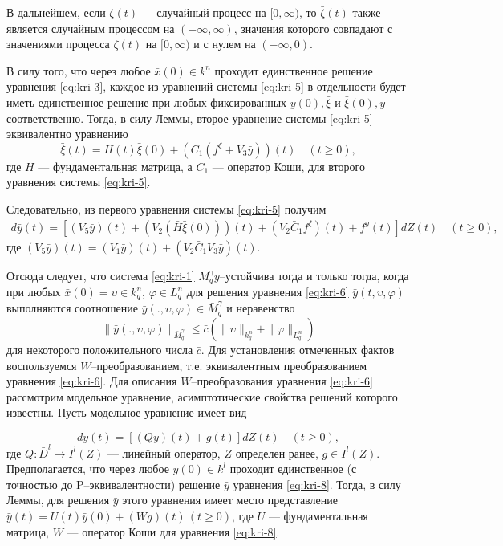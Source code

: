 В дальнейшем, если $\zeta (t)$  --- случайный процесс на
$[0,\infty)$, то $\bar \zeta (t)$ также является  случайным
процессом на  $(- \infty , \infty )$, значения которого  совпадают с
значениями процесса $\zeta (t)$ на $[0,\infty)$ и с нулем на
$(-\infty , 0)$.

В силу того, что через любое $\bar x(0) \in k^n$ проходит
единственное решение уравнения \eqref{eq:kri-3}, каждое из уравнений системы \eqref{eq:kri-5}
в отдельности будет иметь единственное решение при любых
фиксированных $\bar y(0), \bar \xi $ и $\bar \xi(0), \bar y$
соответственно. Тогда, в силу Леммы, второе уравнение системы \eqref{eq:kri-5}
эквивалентно уравнению
$$
\bar \xi(t) = H(t)\bar \xi(0) + (C_1(f^\xi + V_3\bar y))(t) \quad
(t \ge 0),
$$
где $H$ --- фундаментальная матрица, а $C_1$ --- оператор Коши, для
второго уравнения системы \eqref{eq:kri-5}.

Следовательно, из первого уравнения системы \eqref{eq:kri-5} получим
\begin{equation}
    \label{eq:kri-6}
    \begin{array}{crl}
    d\bar y(t) = [(V_5\bar y)(t) + (V_2(\bar H\bar \xi(0)))(t)  +
    (V_2\bar C_1f^\xi)(t) + f^y(t)]dZ(t)\quad (t \ge 0),
    \end{array}
\end{equation}
где $(V_5\bar y)(t) = (V_1\bar y)(t)+ (V_2\bar C_1V_3\bar y)(t)$.


Отсюда следует, что система \eqref{eq:kri-1} $M_q^\gamma y$--устойчива тогда и
только тогда, когда при любых $\bar x(0) = \upsilon \in k^n_q$,
$\varphi \in L^n_q$ для решения уравнения \eqref{eq:kri-6} $\bar y(t, \upsilon,
\varphi)$ выполняются соотношение $\bar y(., \upsilon, \varphi) \in
\bar M_q^\gamma$ и неравенство
\begin{equation}
\label{eq:kri-7}
\|\bar y(., \upsilon, \varphi)\|_{\bar M_q^\gamma} \le \bar c\left(\|\upsilon\|_{k^n_q} +
 \|\varphi \|_{L^n_q}\right)
\end{equation}
для некоторого положительного числа $\bar c$. Для установления
отмеченных фактов воспользуемся $W$--преобразованием, т.е.
эквивалентным преобразованием уравнения \eqref{eq:kri-6}. Для описания
$W$--преобразования уравнения \eqref{eq:kri-6} рассмотрим модельное уравнение,
асимптотические свойства решений которого известны. Пусть модельное
уравнение имеет вид

\begin{equation}
\label{eq:kri-8}
d\bar y(t) = [(Q\bar y)(t) + g(t)]dZ(t) \quad (t \ge 0),
\end{equation}
где $Q:\bar D^l \rightarrow I^l(Z)$ --- линейный оператор, $Z$
определен ранее, $g \in I^l(Z)$. Предполагается, что через любое
$\bar y(0) \in k^l$ проходит единственное (с точностью до
P--эквивалентности) решение $\bar y$ уравнения \eqref{eq:kri-8}. Тогда, в силу
Леммы, для решения $\bar y$ этого уравнения имеет место
представление $\bar y(t) = U(t)\bar y(0) + (Wg)(t){\,} (t \ge 0)$,
где $U$ --- фундаментальная матрица, $W$ --- оператор Коши для
уравнения \eqref{eq:kri-8}.

